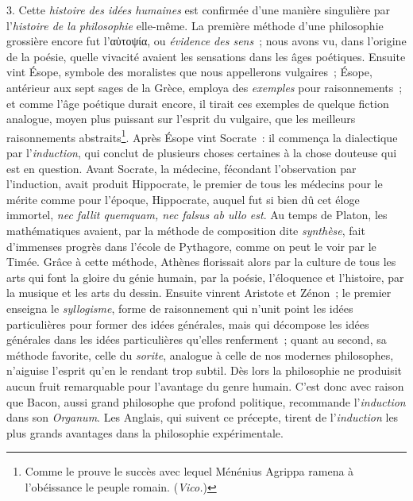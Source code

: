 \documentclass[french,twoside]{book} %
\begin{document}
3. Cette {\itshape histoire des idées humaines} est confirmée d’une manière singulière par l’{\itshape histoire de la}  {\itshape philosophie} elle-même. La première méthode d’une philosophie grossière encore fut l’αὐτοψία, ou {\itshape évidence des sens} ; nous avons vu, dans l’origine de la poésie, quelle vivacité avaient les sensations dans les âges poétiques. Ensuite vint Ésope, symbole des moralistes que nous appellerons vulgaires ; Ésope, antérieur aux sept sages de la Grèce, employa des {\itshape exemples} pour raisonnements ; et comme l’âge poétique durait encore, il tirait ces exemples de quelque fiction analogue, moyen plus puissant sur l’esprit du vulgaire, que les meilleurs raisonnements abstraits\footnote{Comme le prouve le succès avec lequel Ménénius Agrippa ramena à l’obéissance le peuple romain. ({\itshape Vico.})}. Après Ésope vint Socrate : il commença la dialectique par l’{\itshape induction}, qui conclut de plusieurs choses certaines à la chose douteuse qui est en question. Avant Socrate, la médecine, fécondant l’observation par l’induction, avait produit Hippocrate, le premier de tous les médecins pour le mérite comme pour l’époque, Hippocrate, auquel fut si bien dû cet éloge immortel, \emph{{\itshape nec fallit quemquam, nec falsus ab ullo est}}. Au temps de Platon, les mathématiques avaient, par la méthode de composition dite {\itshape synthèse}, fait d’immenses progrès dans l’école de Pythagore, comme on peut le voir par le Timée. Grâce à cette méthode, Athènes florissait alors par la culture de tous les arts qui font la gloire du génie humain, par la poésie, l’éloquence et l’histoire, par la musique et les arts du dessin. Ensuite vinrent  Aristote et Zénon ; le premier enseigna le {\itshape syllogisme}, forme de raisonnement qui n’unit point les idées particulières pour former des idées générales, mais qui décompose les idées générales dans les idées particulières qu’elles renferment ; quant au second, sa méthode favorite, celle du {\itshape sorite}, analogue à celle de nos modernes philosophes, n’aiguise l’esprit qu’en le rendant trop subtil. Dès lors la philosophie ne produisit aucun fruit remarquable pour l’avantage du genre humain. C’est donc avec raison que Bacon, aussi grand philosophe que profond politique, recommande l’{\itshape induction} dans son {\itshape Organum}. Les Anglais, qui suivent ce précepte, tirent de l’{\itshape induction} les plus grands avantages dans la philosophie expérimentale.\par
\end{document}
